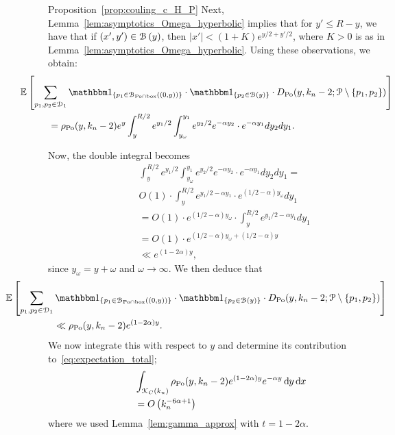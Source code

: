 \begin{proofof}{Proposition~\ref{prop:couling_c_H_P}}
Next, Lemma~\ref{lem:asymptotics_Omega_hyperbolic} implies that for $y'\leq R -y$, we have that if $(x',y') \in {\mathcal B}\left(y\right)$, then $|x'| < (1+ K) e^{y/2 + y'/2}$, where $K >0$ is as in Lemma~\ref{lem:asymptotics_Omega_hyperbolic}. Using these observations, we obtain: 
\begin{align*}
	&\hspace{-30pt} \Exp{\sum_{p_1, p_2\in \dom{1}} \ind{p_1 \in \BallInter{(0,y)}} \cdot \ind{p_2 \in \BallHyp{y}} \cdot 
	D_{\Po} (y,k_n-2;\Pcal \setminus \{p_1, p_2\})} \\
	&= \rho_{\Po}(y,k_n-2)
	e^{y}\int_y^{R/2} e^{y_1/2}\int_{y_\omega}^{y_1} e^{y_2/2} e^{-\alpha y_2} \cdot e^{-\alpha y_1} dy_2 dy_1.
\end{align*}

Now, the double integral becomes
\begin{equation}
\begin{split}
& \int_y^{R/2} e^{y_1/2}\int_{y_\omega}^{y_1} e^{y_2/2} e^{-\alpha y_2} \cdot e^{-\alpha y_1} dy_2 dy_1 = \\
&  O(1) \cdot  \int_y^{R/2} e^{y_1/2 - \alpha y_1} \cdot 
e^{(1/2 - \alpha) y_\omega} dy_1 \\
& =O(1) \cdot e^{(1/2 - \alpha) y_\omega} \cdot \int_y^{R/2} e^{y_1/2 - \alpha y_1} d y_1 \\
& =O(1) \cdot e^{(1/2 - \alpha) y_\omega + (1/2 - \alpha) y} \\ 
& \ll e^{(1 - 2\alpha) y},
\end{split}
\end{equation}
since $y_\omega = y + \omega$ and $\omega \to \infty$. 
We then deduce that 
\begin{equation}
\begin{split}
&\hspace{-50pt}\Exp{\sum_{p_1, p_2\in \dom{1}} \ind{p_1 \in \BallInter{(0,y)}} \cdot \ind{p_2 \in \BallHyp{y}} \cdot 
D_{\Po} (y,k_n-2;\Pcal \setminus \{p_1, p_2\})}\\
& \ll \rho_{\Po}(y,k_n-2) e^{(1-2\alpha)y}.
\end{split}
\end{equation}
We now integrate this with respect to $y$ and determine its contribution to~\eqref{eq:expectation_total};
\begin{align*} 
	& \int_{{\mathcal K}_{C}(k_n)} \rho_{{\mathrm{Po}}}(y,k_n-2) e^{(1-2\alpha)y} e^{-\alpha y} \operatorname{\mathrm{d}\hspace{-2pt}} y \operatorname{\mathrm{d}\hspace{-2pt}} x \\
	&= O\left(k_n^{-6\alpha + 1}\right)
\end{align*}
where we used Lemma~\ref{lem:gamma_approx} with $t = 1 - 2\alpha$.


\end{proofof}
